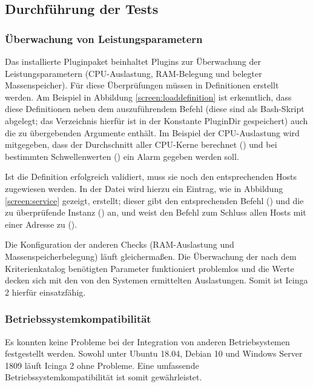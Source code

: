 \subsection{Durchführung der Tests}
\label{sec:DurchführungTests}

\subsubsection{Überwachung von Leistungsparametern}
\label{sec:ÜberwachungLeistungsparameter}
Das installierte Pluginpaket  beinhaltet Plugins zur Überwachung der Leistungsparametern (CPU-Auslastung, RAM-Belegung und belegter Massenspeicher). Für diese Überprüfungen müssen in  Definitionen erstellt werden. Am Beispiel in Abbildung \ref{screen:loaddefinition} ist erkenntlich, dass diese Definitionen neben dem auszuführendem Befehl (diese sind als Bash-Skript abgelegt; das Verzeichnis hierfür ist in der Konstante \glqq{}PluginDir\grqq{} gespeichert) auch die zu übergebenden Argumente enthält. Im Beispiel der CPU-Auslastung wird mitgegeben, dass der Durchschnitt aller CPU-Kerne berechnet () und bei bestimmten Schwellenwerten () ein Alarm gegeben werden soll.

Ist die Definition erfolgreich validiert, muss sie noch den entsprechenden Hosts zugewiesen werden. In der Datei  wird hierzu ein Eintrag, wie in Abbildung \ref{screen:service} gezeigt, erstellt; dieser gibt den entsprechenden Befehl () und die zu überprüfende Instanz () an, und weist den Befehl zum Schluss allen Hosts mit einer Adresse zu ().

Die Konfiguration der anderen Checks (RAM-Auslastung und Massenspeicherbelegung) läuft gleichermaßen. Die Überwachung der nach dem Kriterienkatalog benötigten Parameter funktioniert problemlos und die Werte decken sich mit den von den Systemen ermittelten Auslastungen. Somit ist \glqq{}Icinga 2\grqq{} hierfür einsatzfähig.

\subsubsection{Betriebssystemkompatibilität}
\label{sec:oscompatibility}
Es konnten keine Probleme bei der Integration von anderen Betriebsystemen festgestellt werden. Sowohl unter Ubuntu 18.04, Debian 10 und Windows Server 1809 läuft \glqq{}Icinga 2\grqq{} ohne Probleme. Eine umfassende Betriebssystemkompatibilität ist somit gewährleistet.

